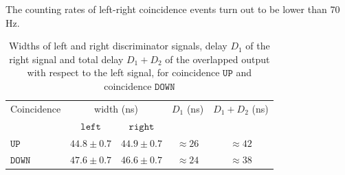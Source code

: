 \documentclass[a4paper]{article}
\begin{document}
The counting rates of left-right coincidence events turn out to be lower than 70 Hz.
% 

\begin{table}[H]
    \centering
    \begin{tabular}{|l|cccc|}
    \hline
        Coincidence & \multicolumn{2}{c}{width (ns)} & $D_1$ (ns)& $D_1+D_2$ (ns)\\
        &$\mathtt{left}$&$\mathtt{right}$&&\\
        \hline
        
        $\mathtt{UP}$ & $44.8\pm0.7$ & $44.9\pm0.7$ & $\approx26$ &$\approx42$\\
        $\mathtt{DOWN}$ & $47.6\pm0.7$ & $46.6\pm0.7$ & $\approx24$ & $\approx38$\\
        \hline
    \end{tabular}
    \caption{Widths of left and right discriminator signals, delay $D_1$ of the right signal and total delay $D_1+D_2$ of the overlapped output with respect to the left signal, for coincidence $\mathtt{UP}$ and coincidence $\mathtt{DOWN}$}
    \label{tab:coincidences}
\end{table}
\end{document}
